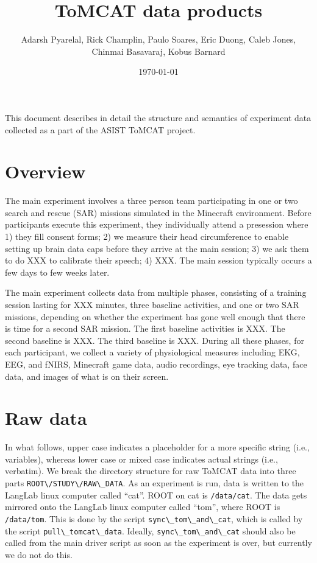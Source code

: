 \documentclass[11pt,letterpaper,oneside,openany,article]{memoir}
\title{ToMCAT data products}
\author{Adarsh Pyarelal, Rick Champlin, Paulo Soares, Eric Duong, Caleb
Jones, Chinmai Basavaraj, Kobus Barnard}
\date{\today}
\newcommand{\code}[1]{\lstinline{#1}}
\begin{document}
\maketitle
\setcounter{page}{2}


This document describes in detail the structure and semantics of experiment data
collected as a part of the ASIST ToMCAT project.


\section{Overview}

The main experiment involves a three person team participating in one or two
search and rescue (SAR) missions simulated in the Minecraft environment.
Before participants execute this experiment, they individually attend a
presession where 1) they fill consent forms; 2) we measure their head circumference to enable setting up brain data caps
before they arrive at the main session; 3) we ask them to do XXX to calibrate
their speech; 4) XXX. The main session typically occurs a few days to few weeks
later.

The main experiment collects data from multiple phases, consisting of a training
session lasting for XXX minutes, three baseline activities, and one or two SAR
missions, depending on whether the experiment has gone well enough that there is
time for a second SAR mission.  The first baseline activities is XXX. The second
baseline is XXX.  The third baseline is XXX.  During all these phases, for each
participant, we collect a variety of physiological measures including EKG, EEG,
and fNIRS, Minecraft game data, audio recordings, eye tracking data, face data,
and images of what is on their screen.

\section{Raw data}

In what follows, upper case indicates
a placeholder for a more specific string (i.e., variables), whereas lower case or mixed case
indicates actual strings (i.e., verbatim).
We break the directory structure for raw ToMCAT data into three parts
\code{ROOT\/STUDY\/RAW\_DATA}.
As an experiment is run, data is written to the LangLab linux computer called
``cat''. ROOT on cat is
\code{/data/cat}. The data gets mirrored onto the LangLab linux computer called
``tom'', where ROOT is \code{/data/tom}.
This is done by the script \code{sync\_tom\_and\_cat}, which is called by the script
\code{pull\_tomcat\_data}. Ideally, \code{sync\_tom\_and\_cat} should also be
called from the main driver script as soon as the experiment is over, but
currently we do not do this.
\end{document}
